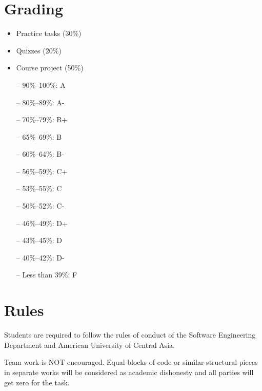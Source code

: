 \documentclass[12pt,a4paper,oneside]{article}
\begin{document}
    \section{Grading}

        \begin{itemize}
            \item Practice tasks (30\%)
            \item Quizzes (20\%)
            \item Course project (50\%)
        \end{itemize}

        \begin{itemize} \itemsep-10pt \parskip0pt 
            \item[--] 90\%--100\%: A\\
            \item[--] 80\%--89\%: A-\\
            \item[--] 70\%--79\%: B+\\
            \item[--] 65\%--69\%: B\\
            \item[--] 60\%--64\%: B-\\
            \item[--] 56\%--59\%: C+\\
            \item[--] 53\%--55\%: C\\
            \item[--] 50\%--52\%: C-\\
            \item[--] 46\%--49\%: D+\\
            \item[--] 43\%--45\%: D\\
            \item[--] 40\%--42\%: D-\\
            \item[--] Less than 39\%: F
        \end{itemize}

    \section{Rules}

        Students are required to follow the rules of conduct of the Software Engineering Department and American University of Central Asia.

        Team work is NOT encouraged. Equal blocks of code or similar structural pieces in separate works will be considered as academic dishonesty and all parties will get zero for the task.
\end{document}
